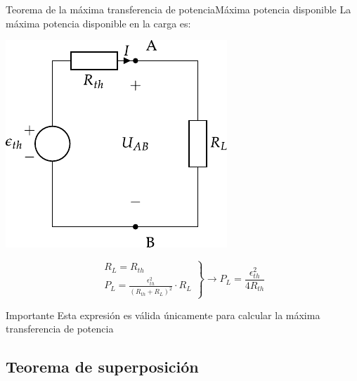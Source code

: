 \documentclass[aspectratio=169, xcolor={usenames,svgnames,dvipsnames}]{beamer}
\begin{document}
\begin{frame}{Teorema de la máxima transferencia de potencia}{Máxima potencia disponible}
La máxima potencia disponible en la carga es:

\vspace{5mm}
\begin{minipage}[c]{0.4\linewidth}
\begin{center}
\includegraphics[height=0.45\textheight]{../figs/thevenin_continua.pdf}
\end{center}
\end{minipage}
\hfill
\begin{minipage}[c]{0.58\linewidth}
\begin{equation*}
  \left.
    \begin{matrix}
      R_L = R_{th}\\
      P_L = \frac{\epsilon^2_{th}}{(R_{th} + R_L)^2} \cdot R_L
    \end{matrix} \right\}\rightarrow
  \boxed{P_L = \frac{\epsilon^2_{th}}{4 R_{th}}}
\end{equation*}

\begin{block}{Importante}
Esta expresión es \alert{válida únicamente} para calcular la máxima transferencia de potencia
\end{block}
\end{minipage}
\end{frame}

\subsection{Teorema de superposición}
\end{document}
